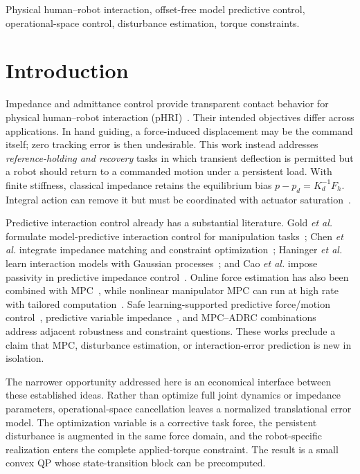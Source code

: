 \documentclass[journal]{IEEEtran}
\begin{document}
\begin{IEEEkeywords}
Physical human--robot interaction, offset-free model predictive control,
operational-space control, disturbance estimation, torque constraints.
\end{IEEEkeywords}

\section{Introduction}

Impedance and admittance control provide transparent contact behavior for
physical human--robot interaction (pHRI)~\cite{hogan1985impedance,chiaverini1999survey}.
Their intended objectives differ across applications.  In hand guiding, a
force-induced displacement may be the command itself; zero tracking error is
then undesirable.  This work instead addresses \emph{reference-holding and
recovery} tasks in which transient deflection is permitted but a robot should
return to a commanded motion under a persistent load.  With finite stiffness,
classical impedance retains the equilibrium bias
$p-p_d=K_d^{-1}F_h$.  Integral action can remove it but must be coordinated
with actuator saturation~\cite{cao2004antiwindup,cao2002antiwindup}.

Predictive interaction control already has a substantial literature. Gold
\emph{et al.} formulate model-predictive interaction control for manipulation
tasks~\cite{gold2023mpic}; Chen \emph{et al.} integrate impedance matching and
constraint optimization~\cite{chen2025unified}; Haninger \emph{et al.} learn
interaction models with Gaussian processes~\cite{haninger2023model}; and
Cao \emph{et al.} impose passivity in predictive impedance
control~\cite{cao2023passive}.  Online force estimation has also been combined
with MPC~\cite{jordana2024force}, while nonlinear manipulator MPC can run at
high rate with tailored computation~\cite{kleff2021highfrequency}.  Safe
learning-supported predictive force/motion control~\cite{matschek2023safe},
predictive variable impedance~\cite{liu2025model}, and MPC--ADRC
combinations~\cite{wu2025ensuring} address adjacent robustness and constraint
questions.  These works preclude a claim that MPC, disturbance estimation, or
interaction-error prediction is new in isolation.

The narrower opportunity addressed here is an economical interface between
these established ideas.  Rather than optimize full joint dynamics or
impedance parameters, operational-space cancellation leaves a normalized
translational error model.  The optimization variable is a corrective task
force, the persistent disturbance is augmented in the same force domain, and
the robot-specific realization enters the complete applied-torque constraint.
The result is a small convex QP whose state-transition block can be precomputed.
\end{document}
